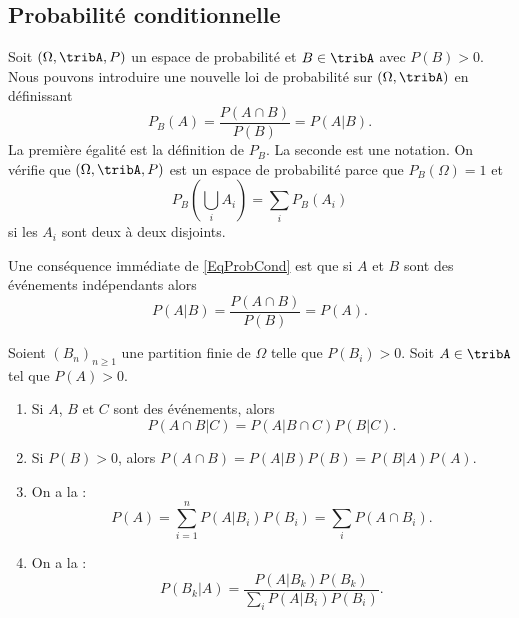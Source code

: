 \subsection{Probabilité conditionnelle}

Soit \( (\Omega,\tribA,P)\) un espace de probabilité et \( B\in\tribA\) avec $P(B)>0$. Nous pouvons introduire une nouvelle loi de probabilité sur \( (\Omega,\tribA)\) en définissant
\begin{equation}    \label{EqProbCond}
    P_B(A)=\frac{ P(A\cap B) }{ P(B) }=P(A|B).
\end{equation}
La première égalité est la définition de \( P_B\). La seconde est une notation. On vérifie que \( (\Omega,\tribA,P)\) est un espace de probabilité parce que \( P_B(\Omega)=1\) et 
\begin{equation}
    P_B(\bigcup_iA_i)=\sum_iP_B(A_i)
\end{equation}
si les \( A_i\) sont deux à deux disjoints.

Une conséquence immédiate de \eqref{EqProbCond} est que si \( A\) et \( B\) sont des événements indépendants alors
\begin{equation}
    P(A|B)=\frac{ P(A\cap B) }{ P(B) }=P(A).
\end{equation}

\begin{theorem}     \label{ThoBayesEtAutres}
    Soient \( (B_n)_{n\geq 1}\) une partition finie de \( \Omega\) telle que \( P(B_i)>0\). Soit \( A\in\tribA\) tel que \( P(A)>0\).
    \begin{enumerate}
        \item
            Si \( A\), \( B\) et \( C\) sont des événements, alors
            \begin{equation}
                P(A\cap B|C)=P(A|B\cap C)P(B|C).
            \end{equation}
        \item
            Si \( P(B)>0\), alors \( P(A\cap B)=P(A|B)P(B)=P(B|A)P(A)\).
        \item On a la  :
            \begin{equation}
                P(A)=\sum_{i=1}^nP(A|B_i)P(B_i)=\sum_iP(A\cap B_i).
            \end{equation}
        \item
            On a la  :
            \begin{equation}
                P(B_k|A)=\frac{ P(A|B_k)P(B_k) }{ \sum_iP(A|B_i)P(B_i) }.
            \end{equation}
    \end{enumerate}
\end{theorem}

